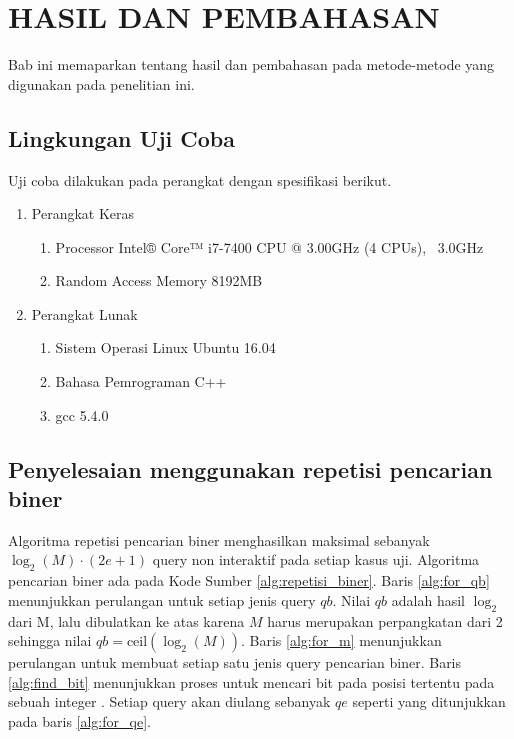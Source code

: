 \chapter{HASIL DAN PEMBAHASAN}

Bab ini memaparkan tentang hasil dan pembahasan pada metode-metode yang digunakan pada penelitian ini.

\section{Lingkungan Uji Coba}

Uji coba dilakukan pada perangkat dengan spesifikasi berikut.

\begin{enumerate}
  \item Perangkat Keras
  \begin{enumerate}
    \item Processor Intel® Core™ i7-7400 CPU @ 3.00GHz (4 CPUs), ~3.0GHz
    \item Random Access Memory 8192MB
  \end{enumerate}
  \item Perangkat Lunak
  \begin{enumerate}
    \item Sistem Operasi Linux Ubuntu 16.04
    \item Bahasa Pemrograman C++
    \item gcc 5.4.0
  \end{enumerate}
\end{enumerate}


\section{Penyelesaian menggunakan repetisi pencarian biner}

Algoritma repetisi pencarian biner menghasilkan maksimal sebanyak $\log_2(M) \cdot (2e + 1)$ query non interaktif pada setiap kasus uji. Algoritma pencarian biner ada pada Kode Sumber \ref{alg:repetisi_biner}. Baris \ref{alg:for_qb} menunjukkan perulangan untuk setiap jenis query $qb$. Nilai $qb$ adalah hasil $\log_2$ dari M, lalu dibulatkan ke atas karena $M$ harus merupakan perpangkatan dari 2 sehingga nilai $qb = \text{ceil}(\log_2(M))$. Baris \ref{alg:for_m} menunjukkan perulangan untuk membuat setiap satu jenis query pencarian biner. Baris \ref{alg:find_bit} menunjukkan proses untuk mencari bit pada posisi tertentu pada sebuah integer \cite{bithack}. Setiap query akan diulang sebanyak $qe$ seperti yang ditunjukkan pada baris \ref{alg:for_qe}.

